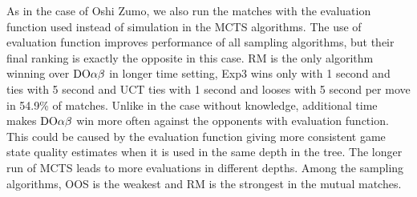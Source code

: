 As in the case of Oshi Zumo, we also run the matches with the evaluation function used instead of simulation in the MCTS algorithms. The use of evaluation function improves performance of all sampling algorithms, but their final ranking is exactly the opposite in this case. RM is the only algorithm winning over $\textrm{DO}\alpha\beta$ in longer time setting, Exp3 wins only with 1 second and ties with 5 second and UCT ties with 1 second and looses with 5 second per move in 54.9\% of matches. Unlike in the case without knowledge, additional time makes $\textrm{DO}\alpha\beta$ win more often against the opponents with evaluation function. This could be caused by the evaluation function giving more consistent game state quality estimates when it is used in the same depth in the tree. The longer run of MCTS leads to more evaluations in different depths.
Among the sampling algorithms, OOS is the weakest and RM is the strongest in the mutual matches.

